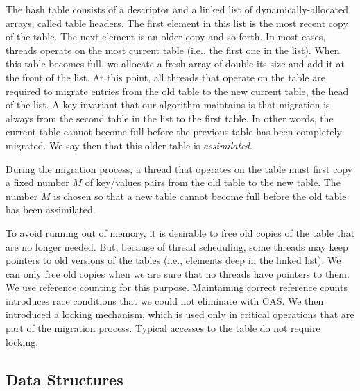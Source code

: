 The hash table consists of a descriptor and a linked list of
dynamically-allocated arrays, called table headers.
The first element in this list is the
most recent copy of the table. The next element is an older copy and
so forth.  In most cases, threads operate on the most current table
(i.e., the first one in the list). When this table becomes full, we
allocate a fresh array of double its size and add it at the front of
the list.  At this point, all threads that operate on the table are
required to migrate entries from the old table to the new current
table, the head of the list. A key invariant that our algorithm
maintains is that migration is always from the second table in the
list to the first table. In other words, the current table cannot
become full before the previous table has been completely migrated.
We say then that this older table is {\em assimilated\/}.

During the migration process, a thread that operates on the table must
first copy a fixed number $M$ of key/values pairs from the old table
to the new table. The number $M$ is chosen so that a new table cannot
become full before the old table has been assimilated.

To avoid running out of memory, it is desirable to free old copies of
the table that are no longer needed. But, because of thread
scheduling, some threads may keep pointers to old versions of the
tables (i.e., elements deep in the linked list). We can only free old
copies when we are sure that no threads have pointers to them. We use
reference counting for this purpose. Maintaining correct reference
counts introduces race conditions that we could not eliminate with
CAS.  We then introduced a locking mechanism, which is used only in
critical operations that are part of the migration process. Typical
accesses to the table do not require locking.


\subsection{Data Structures}


